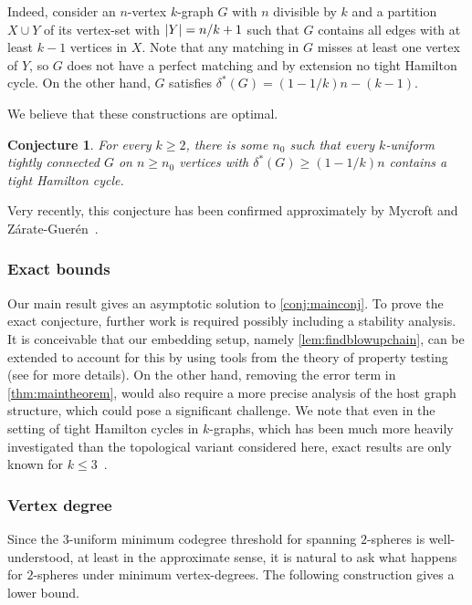 \documentclass[12pt,reqno]{amsart}
\theoremstyle{plain}
\newtheorem{conjecture}[theorem]{Conjecture}
\theoremstyle{definition}
\numberwithin{equation}{section}
\DeclarePairedDelimiter{\abs}{\lvert}{\rvert}
\renewcommand{\geq}{\geqslant}
\renewcommand{\leq}{\leqslant}
\newcommand{\comin}{\delta^{\ast}}
\begin{document}
	Indeed, consider an $n$-vertex $k$-graph $G$ with $n$ divisible by $k$ and a partition $X \cup Y$ of its vertex-set with $\abs{Y} = n/k + 1$ such that $G$ contains all edges with at least $k - 1$ vertices in $X$.
	Note that any matching in $G$ misses at least one vertex of $Y$, so $G$ does not have a perfect matching and by extension no tight Hamilton cycle.
	On the other hand, $G$ satisfies $\delta^\ast(G) = (1 - 1/k)n - (k - 1)$.
	
	We believe that these constructions are optimal.
	
	\begin{conjecture}
		For every $k \geq 2$, there is some $n_0$ such that every $k$-uniform tightly connected $G$ on $n \geq n_0$ vertices with $\comin(G) \geq (1 - 1/k) n$ contains a tight Hamilton cycle.
	\end{conjecture}

    Very recently, this conjecture has been confirmed approximately by Mycroft and Zárate-Guerén~\cite{MZ25}.
	
	\subsubsection*{Exact bounds}
	Our main result gives an asymptotic solution to \cref{conj:mainconj}.
	To prove the exact conjecture, further work is required possibly including a stability analysis.
	It is conceivable that our embedding setup, namely \cref{lem:findblowupchain}, can be extended to account for this by using tools from the theory of property testing (see \cite{lang2023tiling} for more details).
	On the other hand, removing the error term in \cref{thm:maintheorem}, would also require a more precise analysis of the host graph structure, which could pose a significant challenge.
	We note that even in the setting of tight Hamilton cycles in $k$-graphs, which has been much more heavily investigated than the topological variant considered here, exact results are only known for $k \leq 3$~\cite{Dirac,rodl2011dirac}.
	
	\subsubsection*{Vertex degree}
	
	Since the $3$-uniform minimum codegree threshold for spanning $2$-spheres is well-understood, at least in the approximate sense, it is natural to ask what happens for $2$-spheres under minimum vertex-degrees.
	The following construction gives a lower bound.
	
\end{document}
